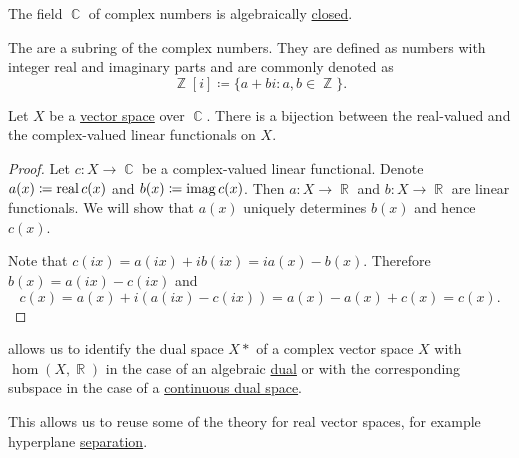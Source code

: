\begin{theorem}\label{thm:fundamental_theorem_of_algebra}
  The field \( \BbbC \) of complex numbers is algebraically \hyperref[def:algebraically_closed_field]{closed}.
\end{theorem}

\begin{definition}\label{def:gaussian_integers}
  The  are a subring of the complex numbers. They are defined as numbers with integer real and imaginary parts and are commonly denoted as
  \begin{equation*}
    \BbbZ[i] \coloneqq \{ a + bi \colon a, b \in \BbbZ \}.
  \end{equation*}
\end{definition}

\begin{theorem}\label{thm:linear_functionals_over_c}
  Let \( X \) be a \hyperref[def:vector_space]{vector space} over \( \BbbC \). There is a bijection between the real-valued and the complex-valued linear functionals on \( X \).
\end{theorem}
\begin{proof}
  Let \( c: X \to \BbbC \) be a complex-valued linear functional. Denote \( a(x) \coloneqq \operatorname{real} c(x) \) and \( b(x) \coloneqq \operatorname{imag} c(x) \). Then \( a: X \to \BbbR \) and \( b: X \to \BbbR \) are linear functionals. We will show that \( a(x) \) uniquely determines \( b(x) \) and hence \( c(x) \).

  Note that \( c(ix) = a(ix) + i b(ix) = i a(x) - b(x) \). Therefore \( b(x) = a(ix) - c(ix) \) and
  \begin{equation*}
    c(x) = a(x) + i (a(ix) - c(ix)) = a(x) - a(x) + c(x) = c(x).
  \end{equation*}
\end{proof}

\begin{remark}\label{rem:linear_functionals_over_c}
   allows us to identify the dual space \( X* \) of a complex vector space \( X \) with \( \hom(X, \BbbR) \) in the case of an algebraic \hyperref[def:dual_vector_space]{dual} or with the corresponding subspace in the case of a \hyperref[def:continuous_dual_space]{continuous dual space}.

  This allows us to reuse some of the theory for real vector spaces, for example hyperplane \hyperref[def:hyperplane_separation]{separation}.
\end{remark}
